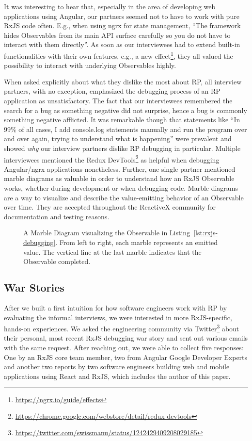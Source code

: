\documentclass[12pt,a4paper]{article}
\begin{document}
It was interesting to hear that, especially in the area of developing web applications using Angular, our partners seemed not to have to work with pure RxJS code often. E.g., when using ngrx for state management, ``The framework hides Observables from its main API surface carefully so you do not have to interact with them directly''. As soon as our interviewees had to extend built-in functionalities with their own features, e.g., a new effect\footnote{\url{https://ngrx.io/guide/effects}}, they all valued the possibility to interact with underlying Observables highly.

When asked explicitly about what they dislike the most about RP, all interview partners, with no exception, emphasized the debugging process of an RP application as unsatisfactory. The fact that our interviewees remembered the search for a bug as something negative did not surprise, hence a bug is commonly something negative afflicted. It was remarkable though that statements like ``In 99\% of all cases, I add console.log statements manually and run the program over and over again, trying to understand what is happening'' were prevalent and showed \emph{why} our interview partners dislike RP debugging in particular. Multiple interviewees mentioned the Redux DevTools\footnote{\url{https://chrome.google.com/webstore/detail/redux-devtools}} as helpful when debugging Angular/ngrx applications nonetheless. Further, one single partner mentioned marble diagrams as valuable in order to understand how an RxJS Observable works, whether during development or when debugging code. Marble diagrams are a way to visualize and describe the value-emitting behavior of an Observable over time. They are accepted throughout the ReactiveX community for documentation\cite{marblediagrams} and testing reasons\cite{marbletesting}.

\begin{figure}[H]
	\centering
	
	\caption{A Marble Diagram visualizing the Observable in Listing~\ref{lst:rxjs-debugging}. From left to right, each marble represents an emitted value. The vertical line at the last marble indicates that the Observable completed.}
	\label{fig:marble-diagram}
\end{figure}

\subsection{War Stories}

After we built a first intuition for how software engineers work with RP by evaluating the informal interviews, we were interested in more RxJS-specific, hands-on experiences. We asked the engineering community via Twitter\footnote{\url{https://twitter.com/swissmanu/status/1242429409208029185}} about their personal, most recent RxJS debugging war story and sent out various emails with the same request. After reaching out, we were able to collect five responses: One by an RxJS core team member, two from Angular Google Developer Experts and another two reports by two software engineers building web and mobile applications using React and RxJS, which includes the author of this paper.
\end{document}
